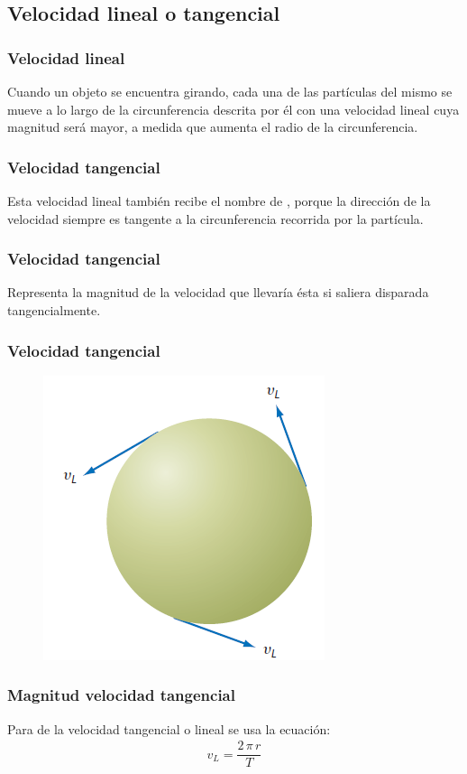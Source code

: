 \documentclass[14pt]{beamer}
\begin{document}
\subsection{Velocidad lineal o tangencial}

\begin{frame}
\frametitle{Velocidad lineal}
Cuando un objeto se encuentra girando, \pause cada una de las partículas del mismo se mueve a lo largo de la circunferencia descrita por él con una velocidad lineal cuya magnitud será mayor, \pause  a medida que aumenta el radio de la circunferencia.
\end{frame}
\begin{frame}
\frametitle{Velocidad tangencial}
Esta velocidad lineal también recibe el nombre de , \pause porque la dirección de la velocidad siempre es tangente a la circunferencia recorrida por la partícula.
\end{frame}
\begin{frame}
\frametitle{Velocidad tangencial}
Representa la magnitud de la velocidad que llevaría ésta si saliera disparada tangencialmente.
\end{frame}
\begin{frame}
\frametitle{Velocidad tangencial}
\vspace*{-1cm}
\begin{figure}
    \centering
    \includegraphics[scale=0.75]{Imagenes/Movimiento_Circular_03.png}
\end{figure}
\end{frame}
\begin{frame}
\frametitle{Magnitud velocidad tangencial}
Para  de la velocidad tangencial o lineal se usa la ecuación:
\pause
\begin{align*}
v_{L} = \dfrac{2 \, \pi \, r}{T}
\end{align*}
\end{frame}
\end{document}
